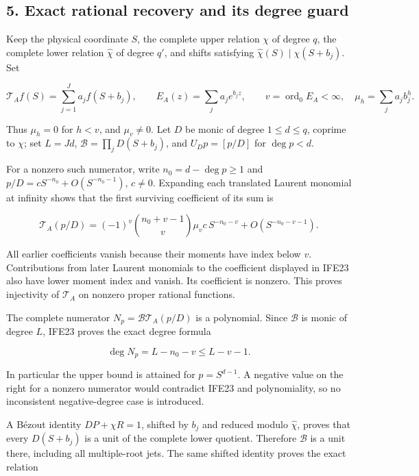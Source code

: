 \documentclass[11pt]{article}
\begin{document}
\subsection{5. Exact rational recovery and its degree guard}\label{exact-rational-recovery-and-its-degree-guard}

Keep the physical coordinate \(S\), the complete upper relation \(\chi\) of degree \(q\), the complete lower relation \(\widehat\chi\) of degree \(q'\), and shifts satisfying \(\widehat\chi(S)\mid\chi(S+b_j)\). Set

\[
\mathcal T_Af(S)=\sum_{j=1}^J a_jf(S+b_j),\qquad
E_A(z)=\sum_ja_je^{b_jz},\qquad
v=\operatorname{ord}_0E_A<\infty,
\quad \mu_h=\sum_ja_jb_j^h.
\tag{IFE22}
\]

Thus \(\mu_h=0\) for \(h<v\), and \(\mu_v\ne0\). Let \(D\) be monic of degree \(1\le d\le q\), coprime to \(\chi\); set \(L=Jd\), \(\mathcal B=\prod_jD(S+b_j)\), and \(U_Dp=[p/D]\) for \(\deg p<d\).

For a nonzero such numerator, write \(n_0=d-\deg p\ge1\) and \(p/D=cS^{-n_0}+O(S^{-n_0-1})\), \(c\ne0\). Expanding each translated Laurent monomial at infinity shows that the first surviving coefficient of its sum is

\[
\mathcal T_A(p/D)
=(-1)^v\binom{n_0+v-1}{v}\mu_vc\,S^{-n_0-v}
+O(S^{-n_0-v-1}).
\tag{IFE23}
\]

All earlier coefficients vanish because their moments have index below \(v\). Contributions from later Laurent monomials to the coefficient displayed in IFE23 also have lower moment index and vanish. Its coefficient is nonzero. This proves injectivity of \(\mathcal T_A\) on nonzero proper rational functions.

The complete numerator \(N_p=\mathcal B\mathcal T_A(p/D)\) is a polynomial. Since \(\mathcal B\) is monic of degree \(L\), IFE23 proves the exact degree formula

\[
\deg N_p=L-n_0-v\le L-v-1.
\tag{IFE24}
\]

In particular the upper bound is attained for \(p=S^{d-1}\). A negative value on the right for a nonzero numerator would contradict IFE23 and polynomiality, so no inconsistent negative-degree case is introduced.

A Bézout identity \(DP+\chi R=1\), shifted by \(b_j\) and reduced modulo \(\widehat\chi\), proves that every \(D(S+b_j)\) is a unit of the complete lower quotient. Therefore \(\mathcal B\) is a unit there, including all multiple-root jets. The same shifted identity proves the exact relation
\end{document}
